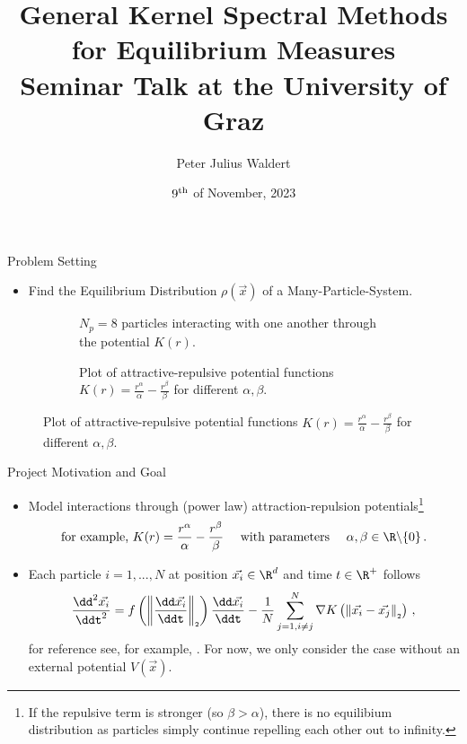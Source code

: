 \documentclass[aspectratio=169, hyperref={colorlinks=true}]{beamer}
\title{General Kernel Spectral Methods for Equilibrium Measures \\ \normalsize Seminar Talk at the University of Graz}
\author{Peter Julius Waldert}
\institute{Mathematical Institute \\ University of Oxford}
\date{$9^{\rm th}$ of November, 2023}
\begin{document}
  {\frame{\titlepage}}

  \begin{frame}{Problem Setting}
    \begin{itemize}
      \item Find the Equilibrium Distribution $\rho(\vec{x})$ of a Many-Particle-System.
    \end{itemize}
    \begin{figure}[H]
      \centering
      \begin{subfigure}[t]{0.5\textwidth}
        \centering
        \caption*{$N_p = 8$ particles interacting with one another through the potential $K(r)$.}
      \end{subfigure}
      \hfill
      \begin{subfigure}[t]{0.49\textwidth}
        \centering
        \caption*{Plot of attractive-repulsive potential functions $K(r) = \frac{r^\alpha}{\alpha} - \frac{r^\beta}{\beta}$ for different $\alpha, \beta$.}
      \end{subfigure}
    \end{figure}
  \end{frame}

  {
  \begin{frame}{Project Motivation and Goal}
    \vspace{0.4cm}
    \begin{itemize}
      \item Model interactions through (power law) attraction-repulsion potentials\footnote{If the repulsive term is stronger (so $\beta > \alpha$), there is no equilibium distribution as particles simply continue repelling each other out to infinity.}
            $$\text{for example,}~K(r) = \frac{r^\alpha}{\alpha} - \frac{r^\beta}{\beta}\quad \text{ with parameters } \quad \alpha, \beta \in \R \backslash \{0\}\,.$$
      \item Each particle $i=1, ..., N$ at position $\vec{x_i} \in \R^d$ and time $t \in \R^+$ follows
            $$\frac{\dd^2 \vec{x_i}}{\ddt^2} = f\left(\norm{\frac{\dd \vec{x_i}}{\ddt}}\right) \frac{\dd\vec{x_i}}{\ddt} - \frac{1}{N} \sum_{j=1, i\neq j}^{N} \nabla K\left(\norm{\vec{x_i} - \vec{x_j}}\right)\,,$$
            for reference see, for example, \parencite{2020-power-law-kernels, 2021-arbitrary-dimensions}.
            For now, we only consider the case without an external potential $V(\vec{x})$.
    \end{itemize}
  \end{frame}
  }
\end{document}
